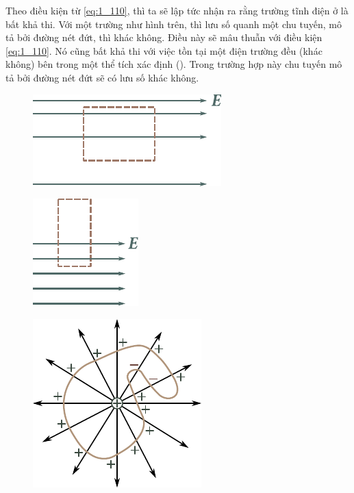 Theo điều kiện từ \eqref{eq:1_110}, thì ta sẽ lập tức nhận ra rằng trường tĩnh điện ở  là bất khả thi. Với một trường như hình trên, thì lưu số quanh một chu tuyến, mô tả bởi đường nét đứt, thì khác không. Điều này sẽ mâu thuẫn với điều kiện \eqref{eq:1_110}. Nó cũng bất khả thi với việc tồn tại một điện trường đều (khác không) bên trong một thể tích xác định (). Trong trường hợp này chu tuyến mô tả bởi đường nét đứt sẽ có lưu số khác không.

\begin{figure}[!htb]
	\begin{minipage}[t]{0.36\linewidth}
		\begin{center}
			\includegraphics[scale=0.93]{figures/ch_01/fig_1_34.pdf}
			\caption[]{}
			\label{fig:1_34}
		\end{center}
	\end{minipage}
	\hfill{ }
	\begin{minipage}[t]{0.2\linewidth}
		\begin{center}
			\includegraphics[scale=0.93]{figures/ch_01/fig_1_35.pdf}
			\caption[]{}
			\label{fig:1_35}
		\end{center}
	\end{minipage}
	\hfill{ }
	\begin{minipage}[t]{0.37\linewidth}
		\begin{center}
			\includegraphics[scale=0.95]{figures/ch_01/fig_1_36.pdf}
			\caption[]{}
			\label{fig:1_36}
		\end{center}
	\end{minipage}
\vspace{-0.45cm}
\end{figure}

